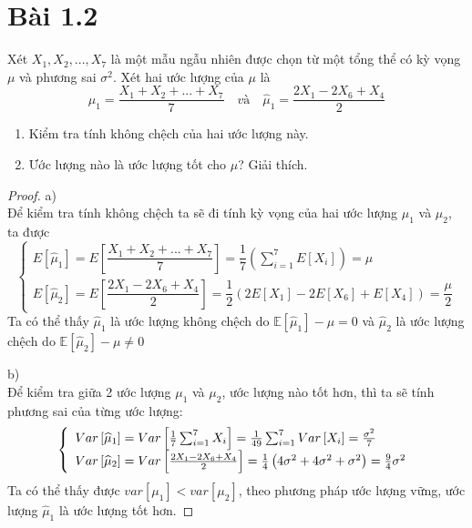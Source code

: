 \newcommand{\N}{\mathbb{N}}
\newcommand{\Z}{\mathbb{Z}}

\section*{Bài 1.2}
%

\begin{problem}{1.2}
Xét $X_1,X_2,...,X_7$ là một mẫu ngẫu nhiên được chọn từ một tổng thể có kỳ vọng $\mu$ và phương sai $\sigma^2$. Xét hai ước lượng của $\mu$ là
\[ \hat{\mu}_1 = \dfrac{X_1+X_2+...+X_7}{7} \quad \textit{và} \quad \hat{\mu}_1 = \dfrac{2X_1-2X_6+X_4}{2}\]
\begin{enumerate}[label=(\alph*)]
\item Kiểm tra tính không chệch của hai ước lượng này.
\item Ước lượng nào là ước lượng tốt cho $\mu$? Giải thích.
\end{enumerate}
\end{problem}

\begin{proof}
a)\\
Để kiểm tra tính không chệch ta sẽ đi tính kỳ vọng của hai ước lượng $\mu_1$ và $\mu_2$, ta được
\begin{equation*}
\left\{\begin{array}{l}E\left[{\widehat\mu}_1\right]=E\left[\dfrac{X_1+X_2+...+X_7}7\right]=\dfrac17\left(\sum_{i=1}^7E\left[X_i\right]\right)=\mu\\E\left[{\widehat\mu}_2\right]=E\left[\dfrac{2X_1-2X_6+X_4}2\right]=\dfrac12\left(2E\left[X_1\right]-2E\left[X_6\right]+E\left[X_4\right]\right)=\dfrac\mu2\end{array}\right.
\end{equation*}
Ta có thể thấy $\hat \mu_1$ là ước lượng không chệch do $\mathbb{E}\left[\hat \mu_1 \right] - \mu = 0$ và $\hat \mu_2$ là ước lượng chệch do $\mathbb{E}\left[\hat \mu_2 \right] - \mu \neq 0$

b)\\
Để kiểm tra giữa 2 ước lượng $\mu_1$ và $\mu_2$, ước lượng nào tốt hơn, thì ta sẽ tính phương sai của từng ước lượng:
\begin{equation*}
\left\{\begin{array}{l}Var\left[{\widehat\mu}_1\right]=Var\left[\frac17\sum_{i=1}^7X_i\right]=\frac1{49}\sum_{i=1}^7Var\left[X_i\right]=\frac{\sigma^2}7\\Var\left[{\widehat\mu}_2\right]=Var\left[\frac{2X_1-2X_6+X_4}2\right]=\frac14\left(4\sigma^2+4\sigma^2+\sigma^2\right)=\frac94\sigma^2\end{array}\right.\\
\end{equation*}
Ta có thể thấy được $var[\mu_1] < var[\mu_2]$, theo phương pháp ước lượng vững, ước lượng $\hat \mu_1$ là ước lượng tốt hơn.
\end{proof}